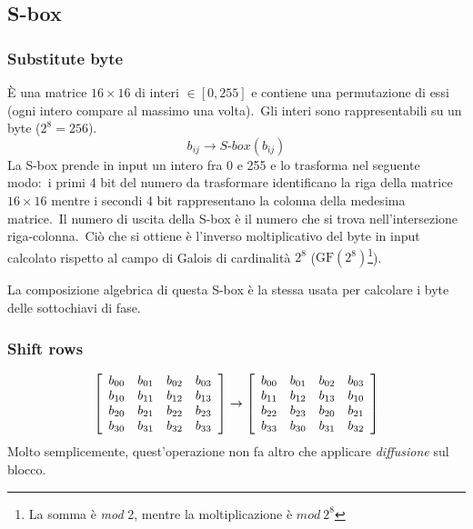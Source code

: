 \subsection{S-box}

\subsubsection{Substitute byte}

È una matrice $16 \times 16$ di interi $\in [0, 255]$ e contiene una permutazione di essi (ogni intero compare al massimo una volta).\
Gli interi sono rappresentabili su un byte ($2^8 = 256$).\
\[b_{ij} \rightarrow S\textrm{-}box(b_{ij})\]
La S-box prende in input un intero fra 0 e 255 e lo trasforma nel seguente modo:\ i primi 4 bit del numero da trasformare identificano la riga della matrice $16 \times 16$ mentre i secondi 4 bit rappresentano la colonna della medesima matrice.\
Il numero di uscita della S-box è il numero che si trova nell'intersezione riga-colonna.\
Ciò che si ottiene è l'inverso moltiplicativo del byte in input calcolato rispetto al campo di Galois di cardinalità $2^8$ ($\mathrm{GF}(2^8)$\footnote{La somma è \textit{mod} 2, mentre la moltiplicazione è $\mathit{mod}\ 2^8$}).\

La composizione algebrica di questa S-box è la stessa usata per calcolare i byte delle sottochiavi di fase.\

\subsubsection{Shift rows}

\[\left[\begin{array}{c c c c}
            b_{00} & b_{01} & b_{02} & b_{03} \\
            b_{10} & b_{11} & b_{12} & b_{13} \\
            b_{20} & b_{21} & b_{22} & b_{23} \\
            b_{30} & b_{31} & b_{32} & b_{33} \\
        \end{array}\right]
    \rightarrow
    \left[\begin{array}{c c c c}
            b_{00} & b_{01} & b_{02} & b_{03} \\
            b_{11} & b_{12} & b_{13} & b_{10} \\
            b_{22} & b_{23} & b_{20} & b_{21} \\
            b_{33} & b_{30} & b_{31} & b_{32} \\
        \end{array}\right]\]
Molto semplicemente, quest'operazione non fa altro che applicare \textit{diffusione} sul blocco.\

